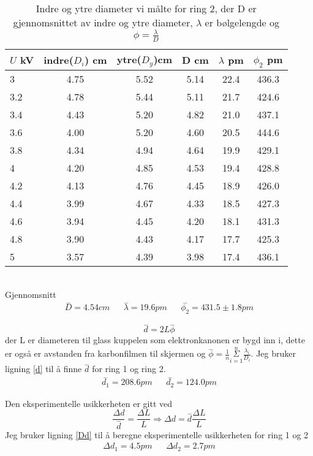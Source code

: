 \documentclass[norsk,a4paper,12pt]{article}
\begin{document}
\begin{table}
\centering
\caption[Diameter ring 2]{Indre og ytre diameter vi målte for ring 2, der D er gjennomsnittet av indre og ytre diameter, $\lambda$ er bølgelengde og $\phi = \frac{\lambda}{D}$}
	\begin{tabular}{| l | c | c | c | c | c |}
	\hline
	$U$ kV & indre($D_i$) cm & ytre($D_y$)cm & D cm & $\lambda$ pm & $\phi_2$ pm\\ 
	\hline
	3 & 4.75 & 5.52 & 5.14 & 22.4 & 436.3\\
	3.2 & 4.78 & 5.44 & 5.11 & 21.7 & 424.6\\
	3.4 & 4.43 & 5.20 & 4.82 & 21.0 & 437.1\\
	3.6 & 4.00 & 5.20 & 4.60 & 20.5 & 444.6\\
	3.8 & 4.34 & 4.94 & 4.64 & 19.9 & 429.1\\
	4 & 4.20 & 4.85 & 4.53 & 19.4 & 428.8\\
	4.2 & 4.13 & 4.76 & 4.45 & 18.9 & 426.0\\
	4.4 & 3.99 & 4.67 & 4.33 & 18.5 & 427.3\\
	4.6 & 3.94 & 4.45 & 4.20 & 18.1 & 431.3\\
	4.8 & 3.90 & 4.43 & 4.17 & 17.7 & 425.3\\
	5 & 3.57 & 4.39 & 3.98 & 17.4 & 436.1\\
	\hline
	\end{tabular}\\
	Gjennomsnitt
	\begin{align*}
	\overset{-}{D} = 4.54cm && \overset{-}{\lambda} = 19.6pm 
	&& \overset{-}{\phi_2} = 431.5 \pm 1.8 pm
	\end{align*}
\label{ring2}
\end{table}

\begin{equation}
\overset{-}{d} = 2L\overset{-}{\phi}
\label{d}
\end{equation}
der L er diameteren til glass kuppelen som elektronkanonen er bygd inn i, dette er også er avstanden fra karbonfilmen til skjermen og $\overset{-}{\phi} = \frac{1}{n}\overset{n}{\underset{i=1}{\Sigma}}\frac{\lambda_i}{D_i}$. 
Jeg bruker ligning \vref{d} til å finne $\overset{-}{d}$ for ring 1 og ring 2.
\begin{align*}
\overset{-}{d_1} = 208.6 pm && \overset{-}{d_2} = 124.0 pm
\end{align*}

Den eksperimentelle usikkerheten er gitt ved 
\begin{equation}
\frac{\Delta d}{\overset{-}{d}} = \frac{\Delta L}{L} \Rightarrow \Delta d = \overset{-}{d}\frac{\Delta L}{L} 
\label{Dd}
\end{equation}
Jeg bruker ligning \vref{Dd} til å beregne eksperimentelle usikkerheten for ring 1 og 2
\begin{align*}
\Delta d_1 = 4.5 pm && \Delta d_2 = 2.7  pm
\end{align*}
\end{document}
